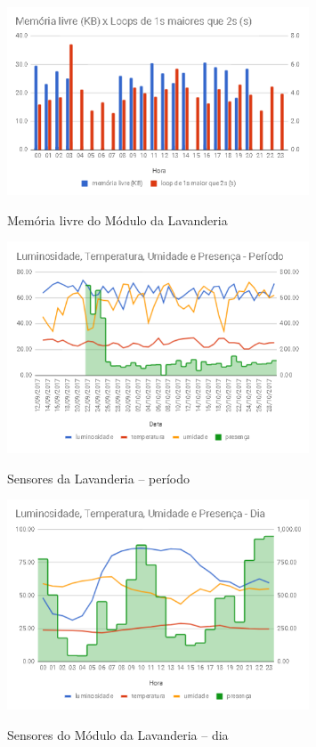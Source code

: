 \begin{figure}[H]
	\centering
	\caption{Memória livre do Módulo da Lavanderia}
	\includegraphics[width=0.8\textwidth]{memLivreLavanderia}
	\label{fig:memLivreLavanderia}
\end{figure}

\begin{figure}[H]
	\centering
	\caption{Sensores da Lavanderia -- período}
	\includegraphics[width=0.8\textwidth]{lavanderiaperiodosensores}
	\label{fig:lavanderiaperiodosensores}
\end{figure}

\begin{figure}[H]
	\centering
	\caption{Sensores do Módulo da Lavanderia -- dia}
	\includegraphics[width=0.8\textwidth]{lavanderiadiasensores}
	\label{fig:lavanderiadiasensores}
\end{figure}

